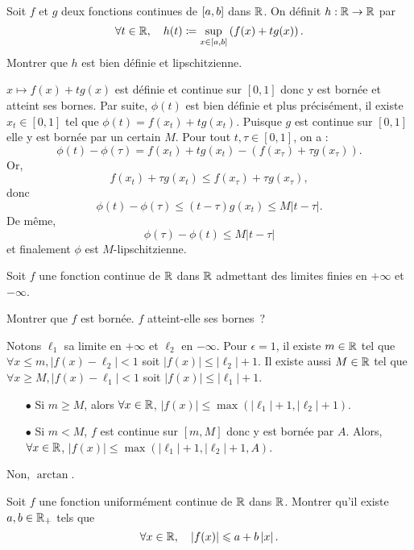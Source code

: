 \documentclass{magnolia}
\begin{document}
Soit $f$ et $g$ deux fonctions continues de $\left[a,b\right]$ dans $\mathbb{R}$.
On définit $h:\mathbb{R}\to\mathbb{R}$ par
\[\forall t\in\mathbb{R} ,\quad h(t)\coloneqq\sup_{x\in\left[a,b\right]}
  \left(f(x)+t g(x)\right).\]
Montrer que $h$ est bien définie et lipschitzienne.
\begin{sol}
  $x\mapsto f(x)+tg(x)$ est définie et continue sur $[0,1]$ donc y est bornée et atteint ses bornes. Par suite, $\phi(t)$ est bien définie et plus précisément, il existe $x_t \in [0,1]$ tel que $\phi(t)=f(x_t)+tg(x_t)$. Puisque $g$ est continue sur $[0,1]$ elle y est bornée par un certain $M$. Pour tout $t,\tau \in [0,1]$, on a :
  $$\phi(t)-\phi(\tau)=f(x_t)+tg(x_t)-(f(x_\tau)+\tau g(x_\tau)).$$ Or, $$f(x_t)+\tau g(x_t)\leq f(x_\tau)+\tau g(x_\tau),$$ donc $$\phi(t)-\phi(\tau)\leq (t-\tau)g(x_t)\leq M|t-\tau|.$$
  De même, $$\phi(\tau)-\phi(t)\leq M|t-\tau|$$ et finalement $\phi$ est $M$-lipschitzienne.
\end{sol}

Soit $f$ une fonction continue de $\mathbb{R}$ dans $\mathbb{R}$ admettant des limites finies
en $+\infty$ et $-\infty$.
\begin{questions}
\question Montrer que $f$ est bornée.
\question $f$ atteint-elle ses bornes~?
\end{questions}

\begin{sol}
\begin{questions}
\question Notons $\ell_1$ sa limite en $+\infty$ et $\ell_2$ en $-\infty$. Pour $\epsilon=1$, il existe $m\in \mathbb{R}$ tel que $\forall x\leq m, |f(x)-\ell_2|<1$ soit $|f(x)|\leq |\ell_2|+1$. Il existe aussi $M\in \mathbb{R}$ tel que $\forall x\geq M, |f(x)-\ell_1|<1$ soit $|f(x)|\leq |\ell_1|+1$.
\begin{itemize}
\item[$\bullet$] Si $m\geq M$, alors $\forall x \in \mathbb{R}$, $|f(x)|\leq \max(|\ell_1|+1,|\ell_2|+1)$.
\item[$\bullet$] Si $m<M$, $f$ est continue sur $[m,M]$ donc y est bornée par $A$. Alors, $\forall x \in \mathbb{R}$, $|f(x)|\leq \max(|\ell_1|+1,|\ell_2|+1,A)$.
\end{itemize}
\question Non, $\arctan$.
\end{questions}

\end{sol}


Soit $f$ une fonction uniformément continue de $\mathbb{R}$ dans $\mathbb{R}$. Montrer qu'il
existe $a,b\in\mathbb{R}_+$ tels que
\[\forall x\in\mathbb{R} ,\quad \left|f(x)\right|\leqslant a+b\left|x\right|.\]
\end{document}
